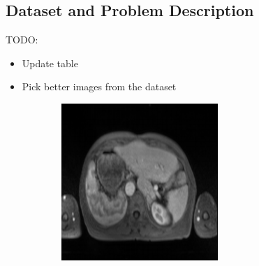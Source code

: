 \subsection{Dataset and Problem Description}

TODO:
\begin{itemize}
    \item Update table
    \item Pick better images from the dataset
\end{itemize}

\begin{figure}
        \begin{subfigure}[b]{0.25\textwidth}
                \centering
                \includegraphics[width=.95\linewidth]{img_hyperopt/abdo_1}
        \end{subfigure}%
        \begin{subfigure}[b]{0.25\textwidth}
                \centering

\end{subfigure}
\end{figure}
